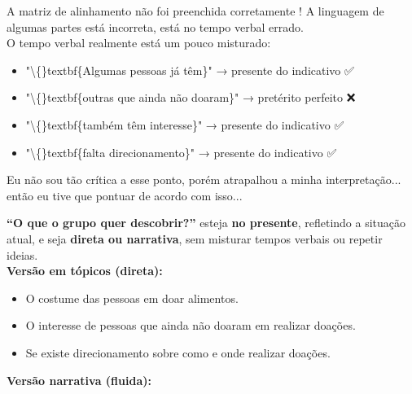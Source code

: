 \documentclass[
  sigconf,
  language=portuguese
]{acmart}
\begin{document}
A matriz de alinhamento não foi preenchida corretamente ! A linguagem de algumas partes está incorreta, está no tempo verbal errado. \\
O tempo verbal realmente está um pouco misturado:

\begin{itemize}[leftmargin=14pt,itemsep=1pt,topsep=3pt]
  \item "\textbackslash\{\}textbf\{Algumas pessoas já têm\}" → presente do indicativo ✅
  \item "\textbackslash\{\}textbf\{outras que ainda não doaram\}" → pretérito perfeito ❌
  \item "\textbackslash\{\}textbf\{também têm interesse\}" → presente do indicativo ✅
  \item "\textbackslash\{\}textbf\{falta direcionamento\}" → presente do indicativo ✅
\end{itemize}
Eu não sou tão crítica a esse ponto, porém atrapalhou a minha interpretação... então eu tive que pontuar de acordo com isso...

\textbf{“O que o grupo quer descobrir?”} esteja \textbf{no presente}, refletindo a situação atual, e seja \textbf{direta ou narrativa}, sem misturar tempos verbais ou repetir ideias.\\
\textbf{Versão em tópicos (direta):}

\begin{itemize}[leftmargin=14pt,itemsep=1pt,topsep=3pt]
  \item O costume das pessoas em doar alimentos.
  \item O interesse de pessoas que ainda não doaram em realizar doações.
  \item Se existe direcionamento sobre como e onde realizar doações.
\end{itemize}
\textbf{Versão narrativa (fluida):}
\end{document}
